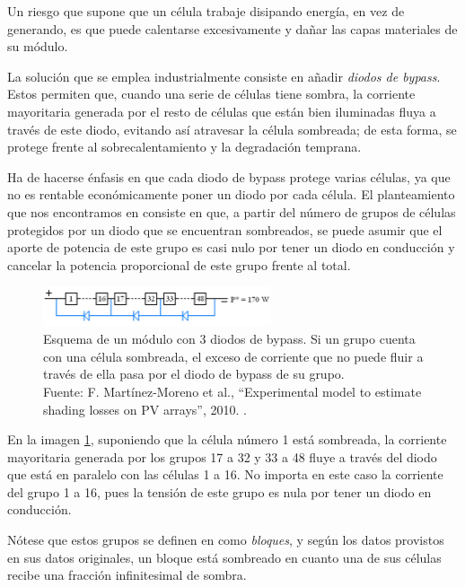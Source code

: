 Un riesgo que supone que un célula trabaje disipando energía, en vez de generando, es que puede calentarse excesivamente y dañar las capas materiales de su \gls{módulo}.

La solución que se emplea industrialmente consiste en añadir \textit{diodos de bypass}. Estos permiten que, cuando una serie de células tiene \gls{sombra}, la corriente mayoritaria generada por el resto de células que están bien iluminadas fluya a través de este diodo, evitando así atravesar la célula sombreada; de esta forma, se protege frente al sobrecalentamiento y la degradación temprana.

Ha de hacerse énfasis en que cada diodo de bypass protege varias células, ya que no es rentable económicamente poner un diodo por cada célula. El planteamiento que nos encontramos en \cite{Martínez-Moreno_Muñoz_Lorenzo_2010} consiste en que, a partir del número de grupos de células protegidos por un diodo que se encuentran sombreados, se puede asumir que el aporte de potencia de este grupo es casi nulo por tener un diodo en conducción y cancelar la potencia proporcional de este grupo frente al total.

\begin{figure}[H]
    \centering
    \includegraphics[width=0.6\textwidth]{./images/bypass_diodes/bypass_diodes.png}
    \caption{Esquema de un módulo con 3 \gls{diodos de bypass}. Si un grupo cuenta con una célula sombreada, el exceso de corriente que no puede fluir a través de ella pasa por el diodo de bypass de su grupo.\\Fuente: F. Martínez-Moreno et al., ``Experimental model to estimate shading losses on PV arrays'', 2010. \cite[Fig. 5, a)]{Martínez-Moreno_Muñoz_Lorenzo_2010}.}
    \label{fig:diodos_bypass}
\end{figure}

En la imagen \ref{fig:diodos_bypass}, suponiendo que la célula número 1 está sombreada, la corriente mayoritaria generada por los grupos 17 a 32 y 33 a 48 fluye a través del diodo que está en paralelo con las células 1 a 16. No importa en este caso la corriente del grupo 1 a 16, pues la tensión de este grupo es nula por tener un diodo en conducción.

Nótese que estos grupos se definen en \cite{Martínez-Moreno_Muñoz_Lorenzo_2010} como \textit{bloques}, y según los datos provistos en sus datos originales, un bloque está sombreado en cuanto una de sus células recibe una fracción infinitesimal de \gls{sombra}.

